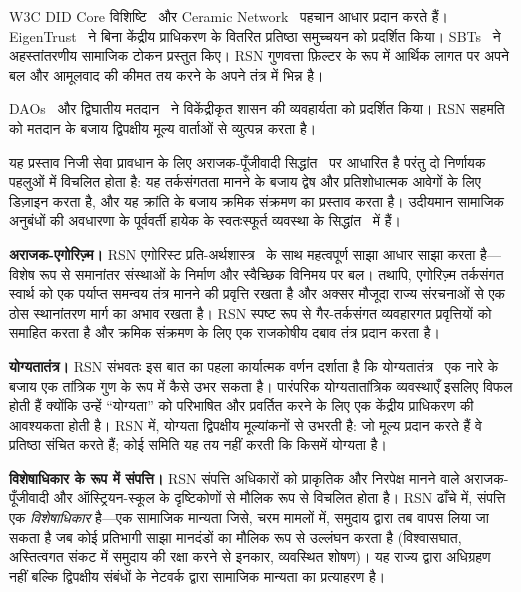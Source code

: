 \documentclass[11pt,a4paper,twocolumn]{article}
\begin{document}
W3C DID Core विशिष्टि~\cite{did2022} और Ceramic Network~\cite{ceramic2023} पहचान आधार प्रदान करते हैं। EigenTrust~\cite{kamvar2003} ने बिना केंद्रीय प्राधिकरण के वितरित प्रतिष्ठा समुच्चयन को प्रदर्शित किया। SBTs~\cite{weyl2022} ने अहस्तांतरणीय सामाजिक टोकन प्रस्तुत किए। RSN गुणवत्ता फ़िल्टर के रूप में आर्थिक लागत पर अपने बल और आमूलवाद की कीमत तय करने के अपने तंत्र में भिन्न है।

DAOs~\cite{buterin2014} और द्विघातीय मतदान~\cite{buterin2019} ने विकेंद्रीकृत शासन की व्यवहार्यता को प्रदर्शित किया। RSN सहमति को मतदान के बजाय द्विपक्षीय मूल्य वार्ताओं से व्युत्पन्न करता है।

यह प्रस्ताव निजी सेवा प्रावधान के लिए अराजक-पूँजीवादी सिद्धांत~\cite{rothbard1973,hoppe2001} पर आधारित है परंतु दो निर्णायक पहलुओं में विचलित होता है: यह तर्कसंगतता मानने के बजाय द्वेष और प्रतिशोधात्मक आवेगों के लिए डिज़ाइन करता है, और यह क्रांति के बजाय क्रमिक संक्रमण का प्रस्ताव करता है। उदीयमान सामाजिक अनुबंधों की अवधारणा के पूर्ववर्ती हायेक के स्वतःस्फूर्त व्यवस्था के सिद्धांत~\cite{hayek1973} में हैं।

\textbf{अराजक-एगोरिज़्म।} RSN एगोरिस्ट प्रति-अर्थशास्त्र~\cite{konkin2006} के साथ महत्वपूर्ण साझा आधार साझा करता है---विशेष रूप से समानांतर संस्थाओं के निर्माण और स्वैच्छिक विनिमय पर बल। तथापि, एगोरिज़्म तर्कसंगत स्वार्थ को एक पर्याप्त समन्वय तंत्र मानने की प्रवृत्ति रखता है और अक्सर मौजूदा राज्य संरचनाओं से एक ठोस स्थानांतरण मार्ग का अभाव रखता है। RSN स्पष्ट रूप से गैर-तर्कसंगत व्यवहारगत प्रवृत्तियों को समाहित करता है और क्रमिक संक्रमण के लिए एक राजकोषीय दबाव तंत्र प्रदान करता है।

\textbf{योग्यतातंत्र।} RSN संभवतः इस बात का पहला कार्यात्मक वर्णन दर्शाता है कि योग्यतातंत्र~\cite{young1958} एक नारे के बजाय एक तांत्रिक गुण के रूप में कैसे उभर सकता है। पारंपरिक योग्यतातांत्रिक व्यवस्थाएँ इसलिए विफल होती हैं क्योंकि उन्हें ``योग्यता'' को परिभाषित और प्रवर्तित करने के लिए एक केंद्रीय प्राधिकरण की आवश्यकता होती है। RSN में, योग्यता द्विपक्षीय मूल्यांकनों से उभरती है: जो मूल्य प्रदान करते हैं वे प्रतिष्ठा संचित करते हैं; कोई समिति यह तय नहीं करती कि किसमें योग्यता है।

\textbf{विशेषाधिकार के रूप में संपत्ति।} RSN संपत्ति अधिकारों को प्राकृतिक और निरपेक्ष मानने वाले अराजक-पूँजीवादी और ऑस्ट्रियन-स्कूल के दृष्टिकोणों से मौलिक रूप से विचलित होता है। RSN ढाँचे में, संपत्ति एक \emph{विशेषाधिकार} है---एक सामाजिक मान्यता जिसे, चरम मामलों में, समुदाय द्वारा तब वापस लिया जा सकता है जब कोई प्रतिभागी साझा मानदंडों का मौलिक रूप से उल्लंघन करता है (विश्वासघात, अस्तित्वगत संकट में समुदाय की रक्षा करने से इनकार, व्यवस्थित शोषण)। यह राज्य द्वारा अधिग्रहण नहीं बल्कि द्विपक्षीय संबंधों के नेटवर्क द्वारा सामाजिक मान्यता का प्रत्याहरण है।
\end{document}

